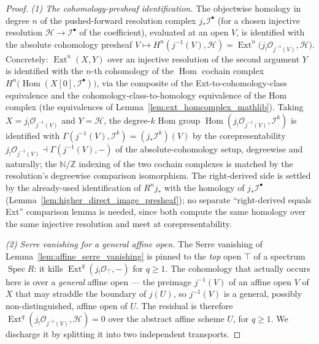 \begin{proof}
  \emph{(1) The cohomology-presheaf identification.} The objectwise homology in degree
  \(n\) of the pushed-forward resolution complex \(j_*\mathcal{I}^\bullet\) (for a chosen
  injective resolution \(\mathcal{H} \to \mathcal{I}^\bullet\) of the coefficient), evaluated at an open
  \(V\), is identified with the absolute cohomology presheaf
  \(V \mapsto H^n(j^{-1}(V), \mathcal{H}) = \operatorname{Ext}^n\bigl(j_!\mathcal{O}_{j^{-1}(V)},
  \mathcal{H}\bigr)\). Concretely: \(\operatorname{Ext}^n(X, Y)\) over an injective resolution of
  the second argument \(Y\) is identified with the \(n\)-th cohomology of the \(\operatorname{Hom}\)
  cochain complex \(H^n\bigl(\operatorname{Hom}(X[0], \mathcal{I}^\bullet)\bigr)\), via the composite
  of the Ext-to-cohomology-class equivalence and the cohomology-class-to-homology equivalence of the
  Hom complex (the equivalences of Lemma~\ref{lem:ext_homcomplex_mathlib}). Taking \(X = j_!\mathcal{O}_{j^{-1}(V)}\) and \(Y =
  \mathcal{H}\), the degree-\(k\) Hom group \(\operatorname{Hom}(j_!\mathcal{O}_{j^{-1}(V)},
  \mathcal{I}^k)\) is identified with \(\Gamma(j^{-1}(V), \mathcal{I}^k) = (j_*\mathcal{I}^k)(V)\) by
  the corepresentability \(j_!\mathcal{O}_{j^{-1}(V)} \dashv \Gamma(j^{-1}(V), -)\) of the absolute-cohomology setup,
  degreewise and naturally; the \(\mathbb{N}\)/\(\mathbb{Z}\) indexing of the two cochain complexes is
  matched by the resolution's degreewise comparison isomorphism. The right-derived side is settled by
  the already-used identification of \(R^n j_*\) with the homology of \(j_*\mathcal{I}^\bullet\)
  (Lemma~\ref{lem:higher_direct_image_presheaf}); no separate ``right-derived equals Ext'' comparison
  lemma is needed, since both compute the same homology over the same injective resolution and meet at
  corepresentability.

  \emph{(2) Serre vanishing for a general affine open.} The Serre vanishing of
  Lemma~\ref{lem:affine_serre_vanishing} is pinned to the \emph{top} open \(\top\) of a spectrum
  \(\operatorname{Spec} R\): it kills \(\operatorname{Ext}^q(j_!\mathcal{O}_\top, -)\) for \(q \geq 1\).
  The cohomology that actually occurs here is over a \emph{general} affine open --- the preimage
  \(j^{-1}(V)\) of an affine open \(V\) of \(X\) that may straddle
  the boundary of \(j(U)\), so \(j^{-1}(V)\) is a general, possibly non-distinguished, affine open of
  \(U\). The residual is therefore \(\operatorname{Ext}^q(j_!\mathcal{O}_{j^{-1}(V)}, \mathcal{H}) = 0\)
  over the abstract affine scheme \(U\), for \(q \geq 1\). We discharge it by splitting it into two
  independent transports.


\end{proof}
